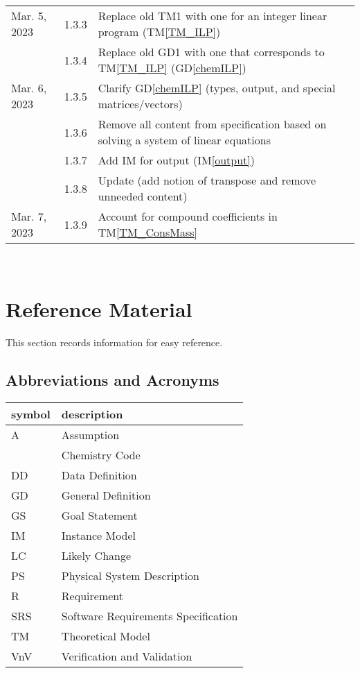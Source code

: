 \documentclass[12pt]{article}
\newcommand{\gdref}[1]{GD\ref{#1}}
\newcommand{\tmref}[1]{TM\ref{#1}}
\newcommand{\iref}[1]{IM\ref{#1}}
\begin{document}
\begin{xltabular}{\textwidth}{llX}
  Mar. 5, 2023 & 1.3.3 & Replace old TM1 with one for an integer linear program
  (\tmref{TM_ILP})\\
  & 1.3.4 & Replace old GD1 with one that corresponds to \tmref{TM_ILP}
  (\gdref{chemILP})\\
  Mar. 6, 2023 & 1.3.5 & Clarify \gdref{chemILP} (types, output, and special
  matrices/vectors) \\
  & 1.3.6 & Remove all content from specification based on solving a system of
  linear equations \\
  & 1.3.7 & Add IM for output (\iref{output}) \\
  & 1.3.8 & Update  (add notion of transpose and remove
  unneeded content) \\
  Mar. 7, 2023 & 1.3.9 & Account for compound coefficients in
  \tmref{TM_ConsMass} \\
\end{xltabular}

~\newpage

\section{Reference Material} \label{sec_refMat}

This section records information for easy reference.

\subsection{Abbreviations and Acronyms} \label{srs_sec_abbsAcrs}

\renewcommand{\arraystretch}{1.2}
\begin{tabular}{l l}
  \toprule
  \textbf{symbol} & \textbf{description}                \\
  \midrule
  A               & Assumption                          \\
  \progname{}     & Chemistry Code                      \\
  DD              & Data Definition                     \\
  GD              & General Definition                  \\
  GS              & Goal Statement                      \\
  IM              & Instance Model                      \\
  LC              & Likely Change                       \\
  PS              & Physical System Description         \\
  R               & Requirement                         \\
  SRS             & Software Requirements Specification \\
  TM              & Theoretical Model                   \\
  VnV             & Verification and Validation         \\
  \bottomrule
\end{tabular}\\
\end{document}
